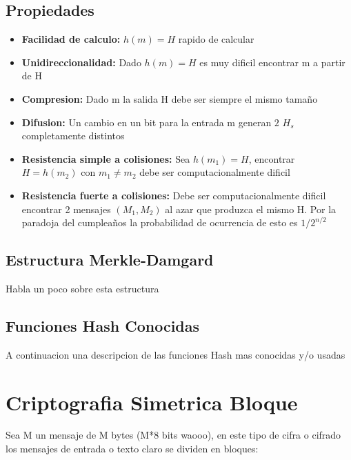 \documentclass{article}
\newcommand{\SP}{\,\,}
\begin{document}
\subsection{Propiedades}
\begin{itemize}
    \item \textbf{Facilidad de calculo:} $h(m) = H$ rapido de calcular
    \item \textbf{Unidireccionalidad:} Dado $h(m) = H$ es muy dificil encontrar m a partir de H
    \item \textbf{Compresion:} Dado m la salida H debe ser siempre el mismo tamaño
    \item \textbf{Difusion:} Un cambio en un bit para la entrada m generan $2 \SP H_{s}$ completamente distintos
    \item \textbf{Resistencia simple a colisiones:} Sea $h(m_{1}) = H$, encontrar $H = h(m_{2})$ con $m_{1} \neq m_{2}$ debe ser
    computacionalmente dificil
    \item \textbf{Resistencia fuerte a colisiones:} Debe ser computacionalmente dificil encontrar 2 mensajes $(M_{1}, M_{2})$ al azar
    que produzca el mismo H. Por la paradoja del cumpleaños la probabilidad de ocurrencia
    de esto es $1/2^{n/2}$
\end{itemize}

\subsection{Estructura Merkle-Damgard}
Habla un poco sobre esta estructura

\subsection{Funciones Hash Conocidas}
A continuacion una descripcion de las funciones Hash mas conocidas y/o usadas

\section{Criptografia Simetrica Bloque}
Sea M un mensaje de M bytes (M*8 bits waooo), en este tipo de cifra o cifrado los mensajes de 
entrada o texto claro se dividen en bloques:\\

\end{document}
